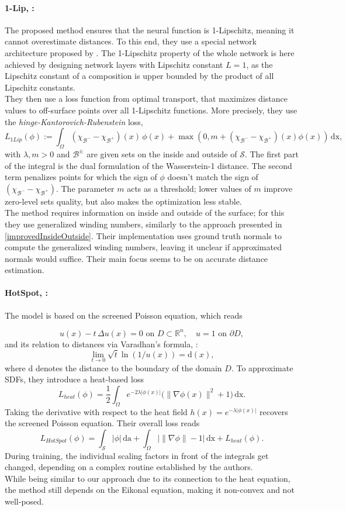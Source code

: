 \documentclass[draft,12pt,openany]{book}
\newcommand{\R}{\mathbb{R}}
\def\S{\mathcal{S}}
\theoremstyle{plainnormal}
\theoremstyle{remark}
\begin{document}
\paragraph{1-Lip, \cite{1lip}:} The proposed method ensures that the neural function is 1-Lipschitz, meaning it cannot overestimate distances. To this end, they use a special network architecture proposed by \cite{araujo2023unifiedalgebraicperspectivelipschitz}. The 1-Lipschitz property of the whole network is here achieved by designing network layers with Lipschitz constant $L=1$, as the Lipschitz constant of a composition is upper bounded by the product of all Lipschitz constants.\\
They then use a loss function from optimal transport, that maximizes distance values to off-surface points over all 1-Lipschitz functions. More precisely, they use the \emph{hinge-Kantorovich-Rubenstein} loss, 
$$
L_{1Lip}(\phi) := \int_\Omega (\chi_{\mathcal B^-}-\chi_{\mathcal B^+})(x)\,\phi(x)  + \max(0,m+ (\chi_{\mathcal B^-}-\chi_{\mathcal B^+})(x)\phi(x))\,\mathrm{dx},
$$
with $\lambda,m >0$ and $\mathcal{B}^\pm$ are given sets on the inside and outside of $\S$. The first part of the integral is the dual formulation of the Wasserstein-1 distance. The second term  penalizes points for which the sign of $\phi$ doesn't match the sign of $ (\chi_{\mathcal B^-}-\chi_{\mathcal B^+})$. The parameter $m$ acts as a threshold; lower values of $m$ improve zero-level sets quality, but also makes the optimization less stable.\\
The method requires information on inside and outside of the surface; for this they use generalized winding numbers, similarly to the approach presented in \cref{improvedInsideOutside}. Their implementation uses ground truth normals to compute the generalized winding numbers, leaving it unclear if approximated normals would suffice. Their main focus seems to be on accurate distance estimation.
\paragraph{HotSpot, \cite{hotspot}:} The model is based on the screened Poisson equation, which reads

$$u(x) - t\,\Delta u(x) = 0 \text{ on } D\subset \R^n, \quad u = 1 \text{ on } \partial D,$$
and its relation to distances via Varadhan's formula, \cite{varadhan}:
$$
\lim_{t\rightarrow0} \sqrt{t}\ln(1/u(x)) = \mathrm{d}(x),$$ 
where $\mathrm{d}$ denotes the distance to the boundary of the domain $D$. To approximate SDFs, they introduce a heat-based loss $$L_{heat}(\phi) = \frac{1}{2}\int_\Omega e^{-2\lambda |\phi(x)|}\big(\|\nabla \phi(x)\|^2 + 1\big) \,\mathrm{dx}.$$ Taking the derivative with respect to the heat field $h(x) = e^{-\lambda|\phi(x)|}$ recovers the screened Poisson equation. Their overall loss reads $$L_{HotSpot}(\phi) = \int_\S |\phi|\,\mathrm{da}  + \int_\Omega \big|\|\nabla \phi\| - 1\big|\,\mathrm{dx} + L_{heat}(\phi).$$
During training, the individual scaling factors in front of the integrals get changed, depending on a complex routine established by the authors.\\ 
While being similar to our approach due to its connection to the heat equation, the method still depends on the Eikonal equation, making it non-convex and not well-posed.
\end{document}
